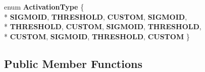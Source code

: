 \begin{DoxyCompactItemize}
\item 
enum {\bfseries Activation\+Type} \{ \\*
{\bfseries S\+I\+G\+M\+O\+I\+D}, 
{\bfseries T\+H\+R\+E\+S\+H\+O\+L\+D}, 
{\bfseries C\+U\+S\+T\+O\+M}, 
{\bfseries S\+I\+G\+M\+O\+I\+D}, 
\\*
{\bfseries T\+H\+R\+E\+S\+H\+O\+L\+D}, 
{\bfseries C\+U\+S\+T\+O\+M}, 
{\bfseries S\+I\+G\+M\+O\+I\+D}, 
{\bfseries T\+H\+R\+E\+S\+H\+O\+L\+D}, 
\\*
{\bfseries C\+U\+S\+T\+O\+M}, 
{\bfseries S\+I\+G\+M\+O\+I\+D}, 
{\bfseries T\+H\+R\+E\+S\+H\+O\+L\+D}, 
{\bfseries C\+U\+S\+T\+O\+M}
 \}\label{class_g_a_n_n_1_1_a_n_n_a09793a3b1a3e795aed773d1a74a373f9}

\end{DoxyCompactItemize}
\subsection*{Public Member Functions}
